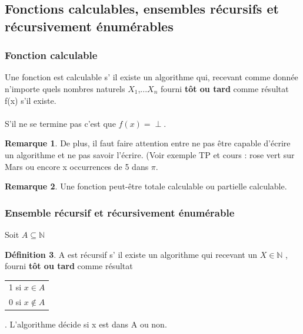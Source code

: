 \documentclass[11pt,a4paper]{article}
\newcommand{\N}{\mathbb{N}}
\theoremstyle{definition}
\newtheorem{mydef}{Définition}
\newtheorem{myrem}[mydef]{Remarque}
\begin{document}

\subsection{Fonctions calculables, ensembles récursifs et récursivement énumérables}
\label{sub:fonctions_calculables_ensembles_r_crusids_et_r_cursivement_num_rables}

\subsubsection{Fonction calculable}
\label{ssub:fonction_calculable}
Une fonction est calculable s’ il existe un algorithme qui, recevant comme donnée
n'importe quels nombres naturels $X_1$,...$X_n$ fourni \textbf{tôt ou tard} comme 
résultat f(x) s’il existe.
\paragraph{} S’il ne se termine pas c'est que $f(x)=\perp$. \\

\begin{myrem}
	De plus, il faut faire attention entre ne pas être capable d'écrire un algorithme
	et ne pas savoir l'écrire. (Voir exemple TP et cours : rose vert sur Mars ou encore
	x occurrences de 5 dans $\pi$.
\end{myrem}

\begin{myrem}
	Une fonction peut-être totale calculable ou partielle calculable.
\end{myrem}


\subsubsection{Ensemble récursif et récursivement énumérable}
\label{ssub:ensemble_r_cursif_et_r_cursivement_num_rable}
Soit $A\subseteq \N$

\begin{mydef}
	A est récursif s’ il existe un algorithme qui recevant un $X\in \N$
	, fourni \textbf{tôt ou tard} comme résultat 
	\begin{tabular}{l}
		1 si $x\in A$\\
		0 si $x\notin A$\\
	\end{tabular}
	. L'algorithme décide si x est dans A ou non.
\end{mydef}
\end{document}
